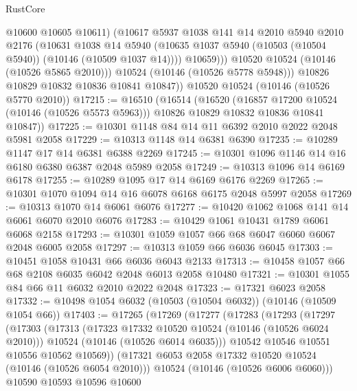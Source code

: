 \begin{lexlean}{RustCore}
\begin{coremodule}
                  @10600
                  @10605
                  @10611)
                (@10617
                  @5937
                  @1038
                  @141
                  @14
                  @2010
                  @5940
                  @2010
                  @2176
                  (@10631
                    @1038
                    @14
                    @5940
                    (@10635 @1037 @5940 (@10503 (@10504 @5940)) (@10146 (@10509 @1037 @14))))
                  @10659)))
            @10520
            @10524
            (@10146 (@10526 @5865 @2010)))
          @10524
          (@10146 (@10526 @5778 @5948)))
        @10826
        @10829
        @10832
        @10836
        @10841
        @10847))
    @10520
    @10524
    (@10146 (@10526 @5770 @2010))
@17215 := @16510
    (@16514
      (@16520
        (@16857 @17200 @10524 (@10146 (@10526 @5573 @5963)))
        @10826
        @10829
        @10832
        @10836
        @10841
        @10847))
@17225 := @10301 @1148 @84 @14 @11 @6392 @2010 @2022 @2048 @5981 @2058
@17229 := @10313 @1148 @14 @6381 @6390
@17235 := @10289 @1147 @17 @14 @6381 @6388 @2269
@17245 := @10301 @1096 @1146 @14 @16 @6180 @6380 @6387 @2048 @5989 @2058
@17249 := @10313 @1096 @14 @6169 @6178
@17255 := @10289 @1095 @17 @14 @6169 @6176 @2269
@17265 := @10301 @1070 @1094 @14 @16 @6078 @6168 @6175 @2048 @5997 @2058
@17269 := @10313 @1070 @14 @6061 @6076
@17277 := @10420 @1062 @1068 @141 @14 @6061 @6070 @2010 @6076
@17283 := @10429 @1061 @10431 @1789 @6061 @6068 @2158
@17293 := @10301 @1059 @1057 @66 @68 @6047 @6060 @6067 @2048 @6005 @2058
@17297 := @10313 @1059 @66 @6036 @6045
@17303 := @10451 @1058 @10431 @66 @6036 @6043 @2133
@17313 := @10458 @1057 @66 @68 @2108 @6035 @6042 @2048 @6013 @2058 @10480
@17321 := @10301 @1055 @84 @66 @11 @6032 @2010 @2022 @2048
@17323 := @17321 @6023 @2058
@17332 := @10498 @1054 @6032 (@10503 (@10504 @6032)) (@10146 (@10509 @1054 @66))
@17403 := @17265
    (@17269
      (@17277
        (@17283
          (@17293
            (@17297
              (@17303
                (@17313
                  (@17323 @17332 @10520 @10524 (@10146 (@10526 @6024 @2010)))
                  @10524
                  (@10146 (@10526 @6014 @6035)))
                @10542
                @10546
                @10551
                @10556
                @10562
                @10569))
            (@17321 @6053 @2058 @17332 @10520 @10524 (@10146 (@10526 @6054 @2010)))
            @10524
            (@10146 (@10526 @6006 @6060)))
          @10590
          @10593
          @10596
          @10600

\end{coremodule}
\end{lexlean}
